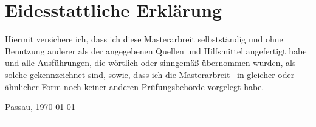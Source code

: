 
\section*{Eidesstattliche Erkl\"arung}

	Hiermit versichere ich, dass ich diese Masterarbreit selbstst\"andig und ohne Benutzung anderer als der angegebenen Quellen und Hilfsmittel angefertigt habe und alle Ausf\"uhrungen, die w\"ortlich oder sinngem\"a\ss{} übernommen wurden, als solche gekennzeichnet sind, sowie, dass ich die Masterarbreit ~in gleicher oder \"ahnlicher Form noch keiner anderen Pr\"ufungsbeh\"orde vorgelegt habe.

	\vspace{3cm}

	Passau, \today

	\vspace{2cm}

	\parbox{8cm}{
		\hrule \strut \theauthor
	}

